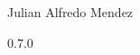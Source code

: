 \documentclass[12pt,a4paper]{book}
\begin{document}
    \begin{center}

        \phantom{H}

        \vspace{80mm}

        {\huge{\Soda}}

        \vspace{80mm}
        Julian Alfredo Mendez

        \vspace{10mm}
        0.7.0

    \end{center}

    \newpage

    
    

    \appendix

    
    
\end{document}
